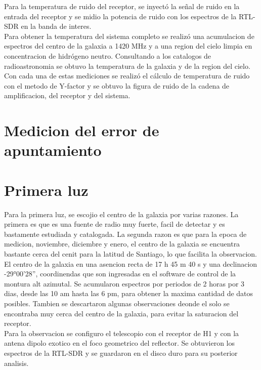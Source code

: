Para la temperatura de ruido del receptor, se inyectó la señal de ruido en la entrada del receptor y se midio la potencia de ruido con los espectros de la RTL-SDR en la banda de interes.\\

Para obtener la temperatura del sistema completo se realizó una acumulacion de espectros del centro de la galaxia a 1420 MHz y a una region del cielo limpia en concentracion de hidrógeno neutro. Consultando a los catalogos de radioastronomia se obtuvo la temperatura de la galaxia y de la region del cielo.\\

Con cada una de estas mediciones se realizó el cálculo de temperatura de ruido con el metodo de Y-factor y se obtuvo la figura de ruido de la cadena de amplificacion, del receptor y del sistema.\\


\section{Medicion del error de apuntamiento}

\section{Primera luz}

Para la primera luz, se escojio el centro de la galaxia por varias razones. La primera es que es una fuente de radio muy fuerte, facil de detectar y es bastamente estudiada y catalogada. La segunda razon es que para la epoca de medicion, noviembre, diciembre y enero, el centro de la galaxia se encuentra bastante cerca del cenit para la latitud de Santiago, lo que facilita la observacion.\\

El centro de la galaxia en una asencion recta de 17 h 45 m 40 s y una declinacion -29°00'28'', coordinendas que son ingresadas en el software de control de la montura alt azimutal. Se acumularon espectros por periodos de 2 horas por 3 dias, desde las 10 am hasta las 6 pm, para obtener la maxima cantidad de datos posibles. Tambien se descartaron algunas observaciones deonde el solo se encontraba muy cerca del centro de la galaxia, para evitar la saturacion del receptor.\\

Para la observacion se configuro el telescopio con el receptor de H1 y con la antena dipolo exotico en el foco geometrico del reflector. Se obtuvieron los espectros de la RTL-SDR y se guardaron en el disco duro para su posterior analisis.\\